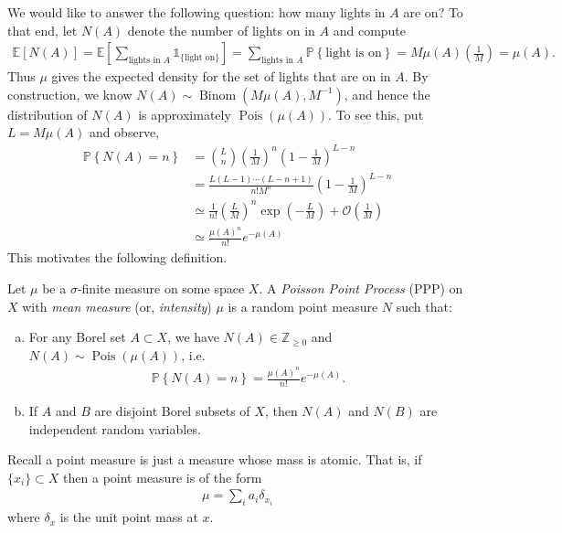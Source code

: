 \documentclass[11pt]{article}
\begin{document}
We would like to answer the following question: how many lights in $A$ are on? To that end, let $N(A)$ denote the number of lights on in $A$ and compute
\begin{align}
	\mathbb{E}\left[ N(A) \right] = \mathbb{E} \left[ \sum_{\text{lights in }A} \mathds{1}_{\{\text{light on}\}} \right]
	= \sum_{\text{lights in }A} \mathbb{P}\left\{ \text{light is on} \right\}
		= M \mu(A) \left(\frac{1}{M}\right)
		= \mu(A).
\end{align}
Thus $\mu$ gives the expected density for the set of lights that are on in $A$. By construction, we know $N(A) \sim \operatorname{Binom}\left(M\mu(A),M^{-1}\right)$, and hence the distribution of $N(A)$ is approximately $\operatorname{Pois}(\mu(A))$. To see this, put $L = M\mu(A)$ and observe,
\begin{align}
	\mathbb{P}\left\{N(A) = n \right\} &= \binom{L}{n}\left(\frac{1}{M}\right)^n\left(1 - \frac{1}{M}\right)^{L-n}\\
	&= \frac{L(L-1)\cdots (L-n+1)}{n! M^n} \left( 1 - \frac{1}{M} \right)^{L-n}\\
	&\simeq \frac{1}{n!}\left( \frac{L}{M} \right)^n \exp\left( -\frac{L}{M} \right) + \mathcal{O}\left( \frac{1}{M} \right)\\
	&\simeq \frac{\mu(A)^n}{n!} e^{-\mu(A)}
\end{align}  
This motivates the following definition.
\begin{definition}
	Let $\mu$ be a $\sigma$-finite measure on some space $X$. A \emph{Poisson Point Process} (PPP) on $X$ with \emph{mean measure} (or, \emph{intensity}) $\mu$ is a random point measure $N$ such that:
	\begin{enumerate}[(a)]
		\item For any Borel set $A\subset X$, we have $N(A) \in \mathbb{Z}_{\geq 0}$ and $N(A) \sim \operatorname{Pois}(\mu(A))$, i.e.
		\begin{align}\label{eq:ppp}
			\mathbb{P}\left\{ N(A) = n \right\} = \frac{\mu(A)^n}{n!} e^{-\mu(A)}.
		\end{align}
		\item If $A$ and $B$ are disjoint Borel subsets of $X$, then $N(A)$ and $N(B)$ are independent random variables.
	\end{enumerate}
\end{definition}
Recall a point measure is just a measure whose mass is atomic. That is, if $\{x_i\}\subset X$ then a point measure is of the form
\begin{align}
	\mu = \sum_i a_i \delta_{x_i}
\end{align}
where $\delta_x$ is the unit point mass at $x$.
\end{document}
